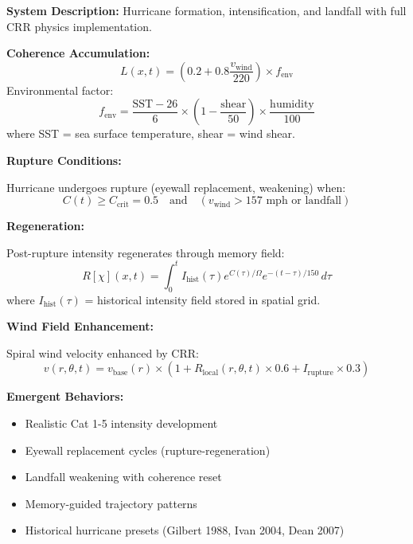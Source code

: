 \documentclass[11pt,a4paper]{article}
\theoremstyle{definition}
\theoremstyle{remark}
\begin{document}
\textbf{System Description:} Hurricane formation, intensification, and landfall with full CRR physics implementation.

\textbf{Coherence Accumulation:}
\begin{equation}
L(x,t) = \left(0.2 + 0.8 \frac{v_{\text{wind}}}{220}\right) \times f_{\text{env}}
\end{equation}
Environmental factor:
\begin{equation}
f_{\text{env}} = \frac{\text{SST} - 26}{6} \times \left(1 - \frac{\text{shear}}{50}\right) \times \frac{\text{humidity}}{100}
\end{equation}
where SST = sea surface temperature, shear = wind shear.

\textbf{Rupture Conditions:}

Hurricane undergoes rupture (eyewall replacement, weakening) when:
\begin{equation}
C(t) \geq C_{\text{crit}} = 0.5 \quad \text{and} \quad \left(v_{\text{wind}} > 157 \text{ mph or landfall}\right)
\end{equation}

\textbf{Regeneration:}

Post-rupture intensity regenerates through memory field:
\begin{equation}
R[\chi](x,t) = \int_0^t I_{\text{hist}}(\tau) e^{C(\tau)/\Omega} e^{-(t-\tau)/150}\,d\tau
\end{equation}
where $I_{\text{hist}}(\tau)$ = historical intensity field stored in spatial grid.

\textbf{Wind Field Enhancement:}

Spiral wind velocity enhanced by CRR:
\begin{equation}
v(r,\theta,t) = v_{\text{base}}(r) \times \left(1 + R_{\text{local}}(r,\theta,t) \times 0.6 + I_{\text{rupture}} \times 0.3\right)
\end{equation}

\textbf{Emergent Behaviors:}
\begin{itemize}
\item Realistic Cat 1-5 intensity development
\item Eyewall replacement cycles (rupture-regeneration)
\item Landfall weakening with coherence reset
\item Memory-guided trajectory patterns
\item Historical hurricane presets (Gilbert 1988, Ivan 2004, Dean 2007)
\end{itemize}
\end{document}
